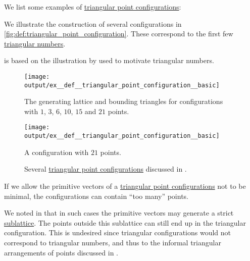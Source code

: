 \begin{example}\label{ex:def:triangular_point_configuration}
  We list some examples of \hyperref[def:triangular_point_configuration]{triangular point configurations}:

  \begin{thmenum}
     We illustrate the construction of several configurations in \cref{fig:def:triangular_point_configuration}. These correspond to the first few \hyperref[def:triangular_number]{triangular numbers}.

     is based on the illustration by  used to motivate triangular numbers.

    \begin{figure}[!ht]
      \begin{subcaptionblock}[t]{0.45\textwidth}
        \centering
        \texttt{[image: output/ex\_\_def\_\_triangular\_point\_configuration\_\_basic]}
        \caption{The generating lattice and bounding triangles for configurations with \( 1 \), \( 3 \), \( 6 \), \( 10 \), \( 15 \) and \( 21 \) points.}\label{fig:def:triangular_point_configuration/basic/triangles}
      \end{subcaptionblock}
      \hfill
      \begin{subcaptionblock}[t]{0.45\textwidth}
        \centering
        \texttt{[image: output/ex\_\_def\_\_triangular\_point\_configuration\_\_basic]}
        \caption{A configuration with \( 21 \) points.}\label{fig:def:triangular_point_configuration/basic/21}
      \end{subcaptionblock}
      \caption{Several \hyperref[def:triangular_point_configuration]{triangular point configurations} discussed in .}\label{fig:def:triangular_point_configuration/basic}
    \end{figure}

     If we allow the primitive vectors of a \hyperref[def:triangular_point_configuration]{triangular point configurations} not to be minimal, the configurations can contain \enquote{too many} points.

    We noted in  that in such cases the primitive vectors may generate a strict \hyperref[def:point_sublattice]{sublattice}. The points outside this sublattice can still end up in the triangular configuration. This is undesired since triangular configurations would not correspond to triangular numbers, and thus to the informal triangular arrangements of points discussed in .


\end{thmenum}
\end{example}
